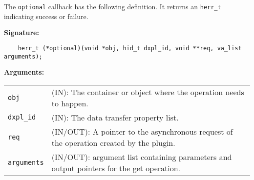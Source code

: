 The {\tt optional} callback has the following definition. It returns an {\tt herr\_t} indicating success or failure. 

\textbf{Signature:}
\begin{lstlisting}
    herr_t (*optional)(void *obj, hid_t dxpl_id, void **req, va_list arguments);
\end{lstlisting}

\textbf{Arguments:}\\
\begin{tabular}{l p{10cm}}
  {\tt obj} & (IN): The container or object where the operation needs to happen.\\
  {\tt dxpl\_id} & (IN): The data transfer property list.\\
  {\tt req} & (IN/OUT): A pointer to the asynchronous request of the operation created by the plugin.\\
  {\tt arguments} & (IN/OUT): argument list containing parameters and output pointers for the get operation. \\
\end{tabular}


